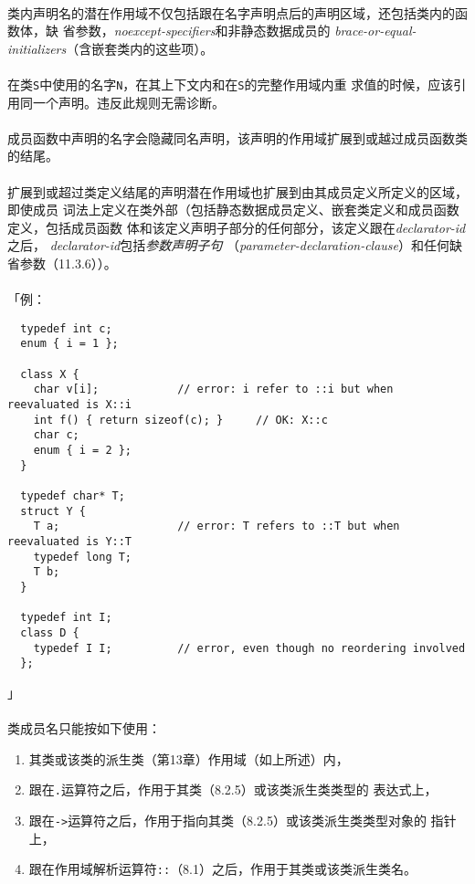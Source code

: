 \paragraph{}
类内声明名的潜在作用域不仅包括跟在名字声明点后的声明区域，还包括类内的函数体，缺
省参数，\textit{noexcept-specifiers}和非静态数据成员的
\textit{brace-or-equal-initializers}（含嵌套类内的这些项）。

\paragraph{}
在类\texttt{S}中使用的名字\texttt{N}，在其上下文内和在\texttt{S}的完整作用域内重
求值的时候，应该引用同一个声明。违反此规则无需诊断。

\paragraph{}
成员函数中声明的名字会隐藏同名声明，该声明的作用域扩展到或越过成员函数类的结尾。

\paragraph{}
扩展到或超过类定义结尾的声明潜在作用域也扩展到由其成员定义所定义的区域，即使成员
词法上定义在类外部（包括静态数据成员定义、嵌套类定义和成员函数定义，包括成员函数
体和该定义声明子部分的任何部分，该定义跟在\textit{declarator-id}之后，
\textit{declarator-id}包括\textit{参数声明子句}
（\textit{parameter-declaration-clause}）和任何缺省参数（11.3.6））。

\paragraph{}
「例：
\begin{lstlisting}
  typedef int c;
  enum { i = 1 };

  class X {
    char v[i];            // error: i refer to ::i but when reevaluated is X::i
    int f() { return sizeof(c); }     // OK: X::c
    char c;
    enum { i = 2 };
  }

  typedef char* T;
  struct Y {
    T a;                  // error: T refers to ::T but when reevaluated is Y::T
    typedef long T;
    T b;
  }

  typedef int I;
  class D {
    typedef I I;          // error, even though no reordering involved
  };
\end{lstlisting}」

\paragraph{}
类成员名只能按如下使用：
\begin{enumerate}
  \item{其类或该类的派生类（第13章）作用域（如上所述）内，}
  \item{跟在\texttt{.}运算符之后，作用于其类（8.2.5）或该类派生类类型的
    表达式上，}
  \item{跟在\texttt{->}运算符之后，作用于指向其类（8.2.5）或该类派生类类型对象的
    指针上，}
  \item{跟在作用域解析运算符\texttt{::}（8.1）之后，作用于其类或该类派生类名。}
\end{enumerate}

